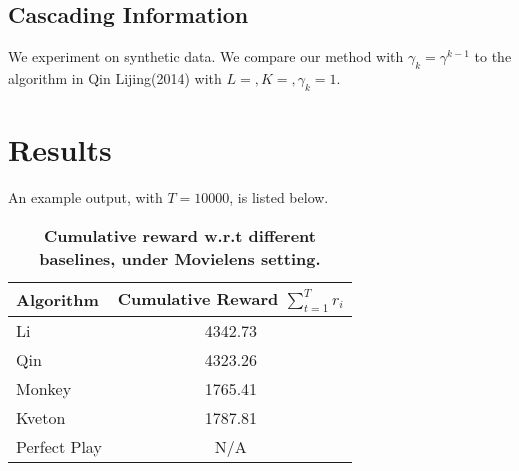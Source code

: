 \documentclass[a4paper,11pt]{article}
\begin{document}
\subsection{Cascading Information}

We experiment on synthetic data. We compare our method with $\gamma_k = \gamma^{k-1}$ to the algorithm in Qin Lijing(2014) with $L= , K= , \gamma_k=1$.

\section{Results}

An example output, with $T=10000$, is listed below.

\begin{table}
    \centering
    \renewcommand{\arraystretch}{1.2}
	\begin{tabular}{lc}
	    \toprule
		\textbf{Algorithm}  &\textbf{Cumulative Reward $\sum_{t=1}^Tr_i $}\\
		\midrule
		Li		    &4342.73 \\
		Qin		    &4323.26 \\
		Monkey		    &1765.41 \\
		Kveton		    &1787.81 \\
		Perfect Play		    &N/A \\
		\bottomrule
	\end{tabular}
	\caption{\textbf{Cumulative reward w.r.t different baselines, under Movielens setting.}}
	\label{daily}
\end{table}
\end{document}

